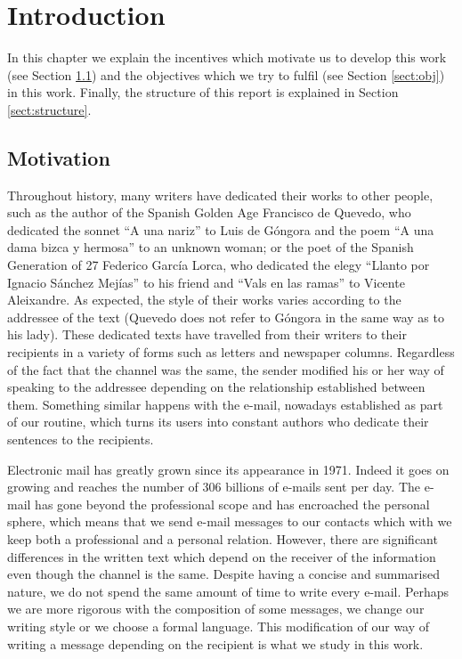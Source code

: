 \chapter{Introduction}
\label{cap:introduccion}


In this chapter we explain the incentives which motivate us to develop this work (see Section \ref{sect:motiv}) and the objectives which we try to fulfil (see Section \ref{sect:obj}) in this work. Finally, the structure of this report is explained in Section \ref{sect:structure}.

\section{Motivation}\label{sect:motiv}
Throughout history, many writers have dedicated their works to other people, such as the author of the Spanish Golden Age Francisco de Quevedo, who dedicated the sonnet ``A una nariz'' to Luis de Góngora and the poem ``A una dama bizca y hermosa'' to an unknown woman; or the poet of the Spanish Generation of 27 Federico García Lorca, who dedicated the elegy ``Llanto por Ignacio Sánchez Mejías'' to his friend and ``Vals en las ramas'' to Vicente Aleixandre. As expected, the style of their works varies according to the addressee of the text (Quevedo does not refer to Góngora in the same way as to his lady). These dedicated texts have travelled from their writers to their recipients in a variety of forms such as letters and newspaper columns. Regardless of the fact that the channel was the same, the sender modified his or her way of speaking to the addressee depending on the relationship established between them. Something similar happens with the e-mail, nowadays established as part of our routine, which turns its users into constant authors who dedicate their sentences to the recipients.

Electronic mail has greatly grown since its appearance in 1971. Indeed it goes on growing and reaches the number of 306 billions of e-mails sent per day. The e-mail has gone beyond the professional scope and has encroached the personal sphere, which means that we send e-mail messages to our contacts which with we keep both a professional and a personal relation. However, there are significant differences in the written text which depend on the receiver of the information even though the channel is the same. Despite having a concise and summarised nature, we do not spend the same amount of time to write every e-mail. Perhaps we are more rigorous with the composition of some messages, we change our writing style or we choose a formal language. This modification of our way of writing a message depending on the recipient is what we study in this work.

